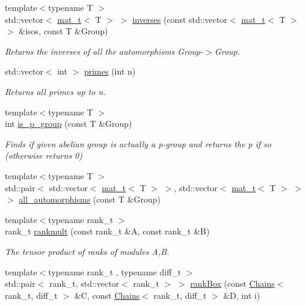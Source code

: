 \begin{DoxyCompactItemize}
{\footnotesize template$<$typename T $>$ }\\std\+::vector$<$ \hyperlink{namespaceMackey_a035386035757dade630f685e508e5cf9}{mat\+\_\+t}$<$ T $>$ $>$ \hyperlink{namespaceMackey_a8c1525b210b4699780bbe05cb16f0e7b}{inverses} (const std\+::vector$<$ \hyperlink{namespaceMackey_a035386035757dade630f685e508e5cf9}{mat\+\_\+t}$<$ T $>$$>$ \&isos, const T \&Group)
\begin{DoxyCompactList}\small\item\em Returns the inverses of all the automorphisms Group-\/$>$Group. \end{DoxyCompactList}\item 
std\+::vector$<$ int $>$ \hyperlink{namespaceMackey_aa136aece9117704b3e5180d92484ed10}{primes} (int n)
\begin{DoxyCompactList}\small\item\em Returns all primes up to n. \end{DoxyCompactList}\item 
{\footnotesize template$<$typename T $>$ }\\int \hyperlink{namespaceMackey_a2b6ac22efe0be546f2c3f8abc2ceb5b7}{is\+\_\+p\+\_\+group} (const T \&Group)
\begin{DoxyCompactList}\small\item\em Finds if given abelian group is actually a p-\/group and returns the p if so (otherwise returns 0) \end{DoxyCompactList}\item 
{\footnotesize template$<$typename T $>$ }\\std\+::pair$<$ std\+::vector$<$ \hyperlink{namespaceMackey_a035386035757dade630f685e508e5cf9}{mat\+\_\+t}$<$ T $>$ $>$, std\+::vector$<$ \hyperlink{namespaceMackey_a035386035757dade630f685e508e5cf9}{mat\+\_\+t}$<$ T $>$ $>$ $>$ \hyperlink{namespaceMackey_a2556e2a1f78783585df78de1c1b35eae}{all\+\_\+automorphisms} (const T \&Group)
\item 
{\footnotesize template$<$typename rank\+\_\+t $>$ }\\rank\+\_\+t \hyperlink{namespaceMackey_aaa0ce7673970bf261628768fb11a1995}{rankmult} (const rank\+\_\+t \&A, const rank\+\_\+t \&B)
\begin{DoxyCompactList}\small\item\em The tensor product of ranks of modules A,B. \end{DoxyCompactList}\item 
{\footnotesize template$<$typename rank\+\_\+t , typename diff\+\_\+t $>$ }\\std\+::pair$<$ rank\+\_\+t, std\+::vector$<$ rank\+\_\+t $>$ $>$ \hyperlink{namespaceMackey_a1257ce64369e72438023fd4e261c7c83}{rank\+Box} (const \hyperlink{classMackey_1_1Chains}{Chains}$<$ rank\+\_\+t, diff\+\_\+t $>$ \&C, const \hyperlink{classMackey_1_1Chains}{Chains}$<$ rank\+\_\+t, diff\+\_\+t $>$ \&D, int i)
$$
\end{DoxyCompactItemize}
